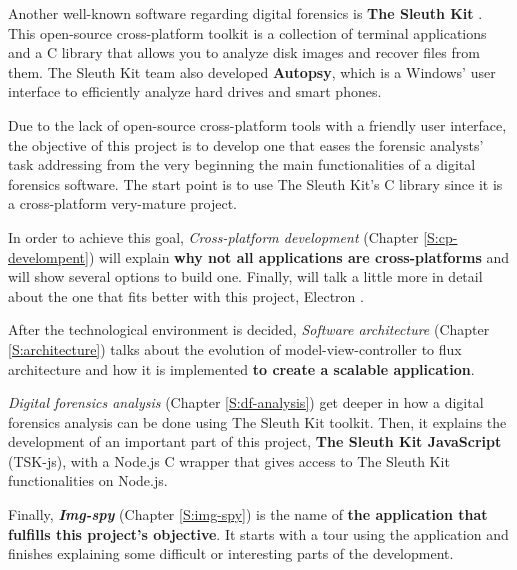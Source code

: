 Another well-known software regarding digital forensics is \textbf{The Sleuth
Kit} \cite{tsk-web}. This open-source cross-platform toolkit is a collection 
of terminal applications and a C library that allows you to analyze disk images
and recover files from them. The Sleuth Kit team also developed
\textbf{Autopsy}, which is a Windows' user interface to efficiently analyze
hard drives and smart phones.

Due to the lack of open-source cross-platform tools with a friendly user
interface, the objective of this project is to develop one that eases the
forensic analysts' task addressing from the very beginning the main
functionalities of a digital forensics software. The start point is to use The
Sleuth Kit's C library  \cite{tsk-web} since it is a cross-platform very-mature
project.

In order to achieve this goal, \textit{Cross-platform development} (Chapter
\ref{S:cp-develompent}) will explain \textbf{why not all applications are
cross-platforms} and will show several options to build one. Finally, will talk
a little more in detail about the one that fits better with this project,
Electron \cite{electron-web}.

After the technological environment is decided, \textit{Software architecture}
(Chapter \ref{S:architecture}) talks about the evolution of 
model-view-controller to flux architecture and how it is implemented \textbf{to 
create a scalable application}.

\textit{Digital forensics analysis} (Chapter \ref{S:df-analysis}) get deeper in
how a digital forensics analysis can be done using The Sleuth Kit toolkit. Then,
it explains the development of an important part of this project, \textbf{The
Sleuth Kit JavaScript} (TSK-js), with a Node.js \cite{nodejs-web} C wrapper
that gives access to The Sleuth Kit functionalities on Node.js.

Finally, \textbf{\textit{Img-spy}} (Chapter \ref{S:img-spy}) is the name of
\textbf{the application that fulfills this project's objective}. It starts with
a tour using the application and finishes explaining some difficult or
interesting parts of the development.

